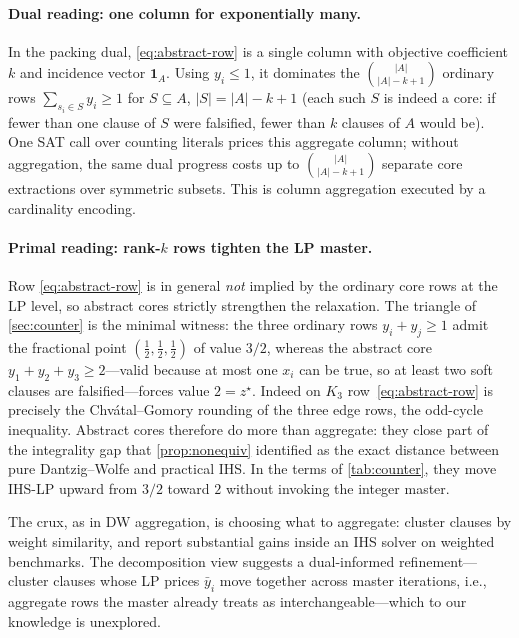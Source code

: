 \paragraph{Dual reading: one column for exponentially many.} In the
packing dual, \eqref{eq:abstract-row} is a single column with objective
coefficient $k$ and incidence vector $\mathbf 1_A$. Using $y_i \le 1$, it
dominates the $\binom{|A|}{|A|-k+1}$ ordinary rows $\sum_{s_i \in S} y_i
\ge 1$ for $S \subseteq A$, $|S| = |A|-k+1$ (each such $S$ is indeed a
core: if fewer than one clause of $S$ were falsified, fewer than $k$
clauses of $A$ would be). One SAT call over counting literals prices this
aggregate column; without aggregation, the same dual progress costs up to
$\binom{|A|}{|A|-k+1}$ separate core extractions over symmetric
subsets. This is column aggregation executed by a cardinality encoding.

\paragraph{Primal reading: rank-$k$ rows tighten the LP master.} Row
\eqref{eq:abstract-row} is in general \emph{not} implied by the ordinary
core rows at the LP level, so abstract cores strictly strengthen the
relaxation. The triangle of \cref{sec:counter} is the minimal witness: the
three ordinary rows $y_i + y_j \ge 1$ admit the fractional point
$(\tfrac12,\tfrac12,\tfrac12)$ of value $3/2$, whereas the abstract core
$y_1 + y_2 + y_3 \ge 2$---valid because at most one $x_i$ can be true, so
at least two soft clauses are falsified---forces value $2 = z^\star$.
Indeed on $K_3$ row~\eqref{eq:abstract-row} is precisely the
Chv\'atal--Gomory rounding of the three edge rows, the odd-cycle
inequality. Abstract cores therefore do more than aggregate: they close
part of the integrality gap that \cref{prop:nonequiv} identified as the
exact distance between pure Dantzig--Wolfe and practical IHS. In the terms
of \cref{tab:counter}, they move IHS-LP upward from $3/2$ toward $2$
without invoking the integer master.

The crux, as in DW aggregation, is choosing what to aggregate:
\citet{berg2020abstract} cluster clauses by weight similarity, and report
substantial gains inside an IHS solver on weighted benchmarks. The
decomposition view suggests a dual-informed refinement---cluster clauses
whose LP prices $\bar y_i$ move together across master iterations, i.e.,
aggregate rows the master already treats as interchangeable---which to our
knowledge is unexplored.

